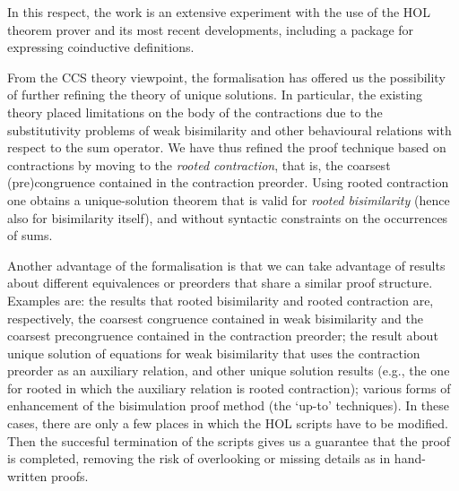   
In this respect,  the work is an extensive experiment with the use of the HOL theorem prover and its
most recent developments, including a package  for expressing coinductive definitions.


From the CCS theory viewpoint, the formalisation has offered us the possibility of 
further refining the theory of unique solutions. 
In particular, the existing theory  placed limitations on the body of the contractions due to the
substitutivity problems of weak bisimilarity and other behavioural relations with respect
to the sum operator.  
We have thus refined the proof  technique based on contractions by moving to the 
\emph{rooted contraction}, that is, the coarsest (pre)congruence contained in the contraction
preorder.  Using rooted contraction one obtains a unique-solution theorem that is valid for
\emph{rooted bisimilarity} (hence also for bisimilarity itself), and without syntactic
constraints on the occurrences of sums.   


Another advantage of the formalisation is 
that we can take advantage of results about different 
equivalences or preorders that share a similar  proof structure. 
Examples are: the results that rooted bisimilarity and rooted contraction are,
respectively, the coarsest congruence contained in weak bisimilarity 
and the coarsest precongruence contained in the contraction  preorder; 
the result about unique solution of equations for weak bisimilarity that uses the
contraction preorder as an auxiliary relation, and other unique solution results (e.g., 
the one for rooted in which
the auxiliary relation is rooted contraction); various forms of enhancement of the bisimulation
proof method (the `up-to' techniques).  
In these cases, there are only a few places in which the HOL scripts have to be modified.
Then the succesful termination of the scripts  gives us a guarantee that the proof is
completed,  removing the risk 
of overlooking or missing details as in hand-written proofs. 



